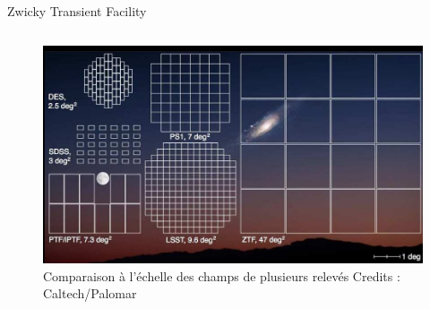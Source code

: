\documentclass{beamer}
\newcommand{\credits}[1]{\tiny Credits : #1}
\begin{document}
\begin{frame}{Zwicky Transient Facility}
\begin{columns}
	\begin{column}{.45\textwidth}
	\begin{figure}
		\centering
		\includegraphics[width=.95\textwidth]{figures/ztf-camera-fov.jpg}
		\caption{Comparaison à l'échelle des champs de plusieurs relevés \credits{Caltech/Palomar}}
	\end{figure}
	\end{column}
\end{columns}
\end{frame}
\end{document}
